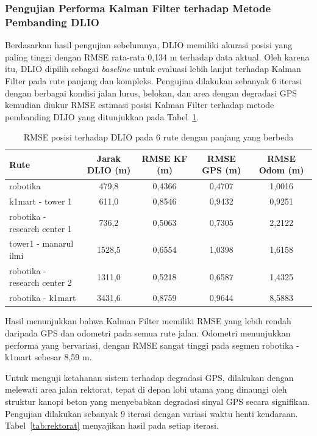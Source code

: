 \subsubsection{Pengujian Performa Kalman Filter terhadap Metode Pembanding DLIO}
\label{sec:pengujian_kf_dlio}

Berdasarkan hasil pengujian sebelumnya, DLIO memiliki akurasi posisi yang paling tinggi dengan RMSE rata-rata 0,134 m terhadap data aktual.
Oleh karena itu, DLIO dipilih sebagai \emph{baseline} untuk evaluasi lebih lanjut terhadap Kalman Filter pada rute panjang dan kompleks.
Pengujian dilakukan sebanyak 6 iterasi dengan berbagai kondisi jalan lurus, belokan, dan area dengan degradasi GPS kemudian diukur RMSE estimasi posisi Kalman Filter terhadap metode pembanding DLIO yang ditunjukkan pada Tabel~\ref{tab:rmse_csv}.

\begin{table}[H]
\centering
\footnotesize
\caption{RMSE posisi terhadap DLIO pada 6 rute dengan panjang yang berbeda}
\label{tab:rmse_csv}
\begin{tabular}{l c c c c}
\hline
\textbf{Rute} & \textbf{Jarak DLIO (m)} & \textbf{RMSE KF (m)} & \textbf{RMSE GPS (m)} & \textbf{RMSE Odom (m)} \\
\hline
robotika                     & 479,8   & 0,4366 & 0,4707 & 1,0016 \\
k1mart - tower 1             & 611,0   & 0,8546 & 0,9432 & 0,9251 \\
robotika - research center 1 & 736,2   & 0,5063 & 0,7305 & 2,2122 \\
tower1 - manarul ilmi        & 1528,5  & 0,6554 & 1,0398 & 1,6158 \\
robotika - research center 2 & 1311,0  & 0,5218 & 0,6587 & 1,4325 \\
robotika - k1mart            & 3431,6  & 0,8759 & 0,9644 & 8,5883 \\
\hline
\end{tabular}
\end{table}

Hasil menunjukkan bahwa Kalman Filter memiliki RMSE yang lebih rendah daripada GPS dan odometri pada semua rute jalan.
Odometri menunjukkan performa yang bervariasi, dengan RMSE sangat tinggi pada segmen robotika - k1mart sebesar 8,59 m.

Untuk menguji ketahanan sistem terhadap degradasi GPS, dilakukan dengan melewati area jalan rektorat, tepat di depan lobi utama yang dinaungi oleh struktur kanopi beton yang menyebabkan degradasi sinyal GPS secara signifikan.
Pengujian dilakukan sebanyak 9 iterasi dengan variasi waktu henti kendaraan. Tabel~\ref{tab:rektorat} menyajikan hasil pada setiap iterasi.

